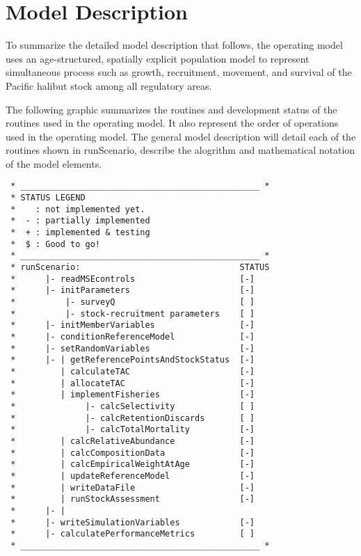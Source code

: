 \section{Model Description} %
\label{sec:model_description}
To summarize the detailed model description that follows, the operating model uses an age-structured, spatially explicit population model to represent simultaneous process such as growth, recruitment, movement, and survival of the Pacific halibut stock among all regulatory areas.

The following graphic summarizes the routines and development status of the routines used in the operating model.  It also represent the order of operations used in the operating model.  The general model description will detail each of the routines shown in runScenario, describe the alogrithm and mathematical notation of the model elements.
\begin{verbatim}
 * ________________________________________________ *
 * STATUS LEGEND
 *    : not implemented yet.
 *  - : partially implemented
 *  + : implemented & testing
 *  $ : Good to go! 
 * ________________________________________________ *
 * runScenario:                                STATUS
 *      |- readMSEcontrols                     [-]
 *      |- initParameters                      [-]
 *          |- surveyQ                         [ ]
 *          |- stock-recruitment parameters    [ ]
 *      |- initMemberVariables                 [-]
 *      |- conditionReferenceModel             [-]
 *      |- setRandomVariables                  [-]
 *      |- | getReferencePointsAndStockStatus  [-]
 *         | calculateTAC                      [-]
 *         | allocateTAC                       [-]
 *         | implementFisheries                [-]
 *              |- calcSelectivity             [ ]
 *              |- calcRetentionDiscards       [ ]
 *              |- calcTotalMortality          [-]
 *         | calcRelativeAbundance             [-]
 *         | calcCompositionData               [-]
 *         | calcEmpiricalWeightAtAge          [-]
 *         | updateReferenceModel              [-]
 *         | writeDataFile                     [-]
 *         | runStockAssessment                [-]
 *      |- |            
 *      |- writeSimulationVariables            [-]
 *      |- calculatePerformanceMetrics         [ ]
 * ________________________________________________ *
\end{verbatim}

